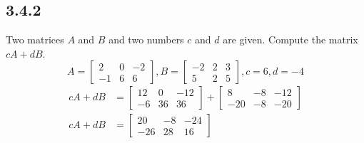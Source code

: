 \documentclass{article}
\begin{document}
\subsection{3.4.2}
Two matrices $ A $ and $ B $ and two numbers $ c $ and $ d $ are given. Compute the matrix $ cA + dB $.
$$
	A = \begin{bmatrix}
		2 & 0 & -2 \\
		-1 & 6 & 6
	\end{bmatrix},
	B = \begin{bmatrix}
		-2 & 2 & 3 \\
		5 & 2 & 5
	\end{bmatrix},
	c = 6, d = -4
$$
\begin{align*}
	cA + dB & = \begin{bmatrix}
		12 & 0 & -12 \\
		-6 & 36 & 36
	\end{bmatrix}
	+ \begin{bmatrix}
		8 & -8 & -12 \\
		-20 & -8 & -20
	\end{bmatrix} \\
	cA + dB & = \begin{bmatrix}
		20 & -8 & -24 \\
		-26 & 28 & 16
	\end{bmatrix}
\end{align*}
\end{document}
